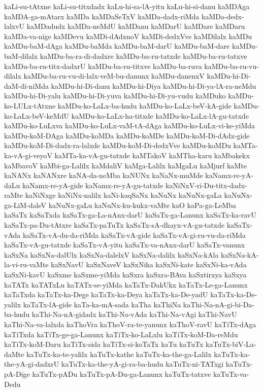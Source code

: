 {kaLi-su-tAtxne
kaLi-su-titxdadx
kaLu-hi-sa-lA-yitu
kaLu-hi-si-danu
kaMDAga
kaMDA-ga-mAtarx
kaMDa
kaMDaSeTxV
kaMDa-dadx-riMda
kaMDa-dedx-lalxvU
kaMDadudx
kaMDa-neMdU
kaMDanu
kaMDarU
kaMDare
kaMDaru
kaMDa-va-nige
kaMDevu
kaMDi-dAdxnoV
kaMDi-dedxVve
kaMDilalx
kaMDu
kaMDu-baM-dAga
kaMDu-baMda
kaMDu-baM-darU
kaMDu-baM-dare
kaMDu-baM-dilalx
kaMDu-ba-ra-di-dadxre
kaMDu-ba-ru-tatxde
kaMDu-ba-ru-tatxve
kaMDu-ba-ru-titx-dadxrU
kaMDu-ba-ru-titxve
kaMDu-ba-ruva
kaMDu-ba-ru-vu-dilalx
kaMDu-ba-ru-vu-di-lalx-veM-bu-danunx
kaMDu-danenxV
kaMDu-hi-Di-daM-di-niMda
kaMDu-hi-Di-danu
kaMDu-hi-Diya
kaMDu-hi-Di-ya-lA-ra-neMdu
kaMDu-hi-Di-yalu
kaMDu-hi-Di-yuva
kaMDu-hi-Di-yu-vudu
kaMDuko
kaMDu-ko-LULx-tAtxne
kaMDu-ko-LaLx-ba-hudu
kaMDu-ko-LaLx-beV-kA-gide
kaMDu-ko-LaLx-beV-keMdU
kaMDu-ko-LaLx-ha-titxde
kaMDu-ko-LaLx-lA-gu-tatxde
kaMDu-ko-LuLxva
kaMDu-ko-LuLx-vaM-tA-dAga
kaMDu-ko-LuLx-vi-ke-yiMda
kaMDu-koM-DAga
kaMDu-koMDa
kaMDu-koMDe
kaMDu-koM-Di-dAdx-gide
kaMDu-koM-Di-dadx-ra-lalxde
kaMDu-koM-Di-dedxVve
kaMDu-koMDu
kaMTa-ka-vA-gi-veyoV
kaMTa-ka-vA-gu-tatxde
kaMTakoV
kaMTha-karu
kaMbakekx
kaMbavoV
kaMbi-ga-Lalilx
kaMdaliV
kaMga-Lalilx
kaMgaLu
kaMjurf
kaMte
kaNANx
kaNANxre
kaNA-da-neMba
kaNUNx
kaNaNx-muMde
kaNamx-re-yA-daLu
kaNamx-re-yA-gide
kaNamx-re-yA-gu-tatxde
kaNiNxV-ri-Du-titx-dadx-raMte
kaNiNxge
kaNiNx-nalilx
kaNi-kaqSaNx
kaNuNx
kaNuNx-gaLa
kaNuNx-ga-LiM-daleV
kaNuNx-gaLu
kaNuNx-ku-kukx-vaMte
kaO
kaPa-ga-LeMba
kaSaTx
kaSaTxda
kaSaTx-ga-La-nAnx-darU
kaSaTx-ga-Lanunx
kaSaTx-ka-ravU
kaSaTx-pa-Du-tAtxre
kaSaTx-paTuTx
kaSaTx-sA-dhayx-vA-gu-tatxde
kaSaTx-vAda
kaSaTx-vA-du-da-riMda
kaSaTx-vA-gide
kaSaTx-vA-gi-ru-vu-da-riMda
kaSaTx-vA-gu-tatxde
kaSaTx-vA-yitu
kaSaTx-va-nAnx-darU
kaSaTx-vanunx
kaSxNa
kaSxNa-dalUlx
kaSxNa-dalelxV
kaSxNa-dalilx
kaSxNa-kAla
kaSxNa-kA-la-vi-ru-vaMte
kaSxNavU
kaSxNaveV
kaSxNika
kaSxNi-kate
kaSxNi-ka-vAda
kaSxNi-kavU
kaSxme
kaSxme-yiMda
kaSxra
kaSxra-BAva
kaSxtirxya
kaSxya
kaTATx
kaTATxLu
kaTATx-se-yiMda
kaTaTx-DakUkx
kaTaTx-Le-ga-Lanunx
kaTaTxda
kaTaTx-ka-Dege
kaTaTx-ka-Deya
kaTaTx-ka-De-yadU
kaTaTx-ka-De-yalilx
kaTaTx-lA-gide
kaTa-ka-mA-sada
kaTha
kaThiNa
kaThi-Na-nA-gi-bi-Da-ba-hudu
kaThi-Na-nA-gidadx
kaThi-Na-vAda
kaThi-Na-vAgi
kaThi-NavU
kaThi-Na-va-lalxda
kaThoVra
kaThoV-ra-te-yanunx
kaThoV-ravU
kaTiTx-dAga
kaTiTxda
kaTiTx-ge-ga-Lanunx
kaTiTx-ko-LaLxlu
kaTiTx-koM-Da-reMdu
kaTiTx-koM-Daru
kaTiTx-sida
kaTiTx-si-koTaTx
kaTu
kaTuTx
kaTuTx-biV-La-daMte
kaTuTx-ka-te-yalilx
kaTuTx-kathe
kaTuTx-ka-the-ga-Lalilx
kaTuTx-ka-the-yA-gi-dadxrU
kaTuTx-ka-the-yA-gi-ra-ba-hudu
kaTuTx-ni-TATxgi
kaTuTx-pA-Dige
kaTuTx-pADu
kaTuTx-pA-Du-ga-Lanunx
kaTuTx-tatxve
kaTuTx-va-Dedu
}
